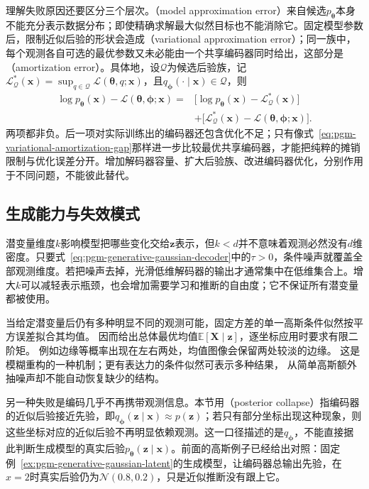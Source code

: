 理解失败原因还要区分三个层次。（model approximation error）来自候选$p_{\bm{\theta}}$本身不能充分表示数据分布；即使精确求解最大似然目标也不能消除它。固定模型参数后，限制近似后验的形状会造成（variational approximation error）；同一族中，每个观测各自可选的最优参数又未必能由一个共享编码器同时给出，这部分是（amortization error）。具体地，设$\mathcal{Q}$为候选后验族，记$\mathcal{L}_{\mathcal{Q}}^*(\bm{x})=\sup_{q\in\mathcal{Q}}\mathcal{L}(\bm{\theta},q;\bm{x})$，且$q_{\bm{\phi}}(\cdot\mid\bm{x})\in\mathcal{Q}$，则
\begin{equation}
  \label{eq:pgm-generative-inference-gaps}
  \begin{aligned}
    \log p_{\bm{\theta}}(\bm{x})
      -\mathcal{L}(\bm{\theta},\bm{\phi};\bm{x})
    ={}&\bigl[\log p_{\bm{\theta}}(\bm{x})
             -\mathcal{L}_{\mathcal{Q}}^*(\bm{x})\bigr]\\
       &+\bigl[\mathcal{L}_{\mathcal{Q}}^*(\bm{x})
             -\mathcal{L}(\bm{\theta},\bm{\phi};\bm{x})\bigr].
  \end{aligned}
\end{equation}
两项都非负。后一项对实际训练出的编码器还包含优化不足；只有像式~\eqref{eq:pgm-variational-amortization-gap}那样进一步比较最优共享编码器，才能把纯粹的摊销限制与优化误差分开。增加解码器容量、扩大后验族、改进编码器优化，分别作用于不同问题，不能彼此替代。

\subsection{生成能力与失效模式}
\label{sec:pgm-generative-vae-failure}

潜变量维度$k$影响模型把哪些变化交给$\bm{z}$表示，但$k<d$并不意味着观测必然没有$d$维密度。只要式~\eqref{eq:pgm-generative-gaussian-decoder}中的$\tau>0$，条件噪声就覆盖全部观测维度。若把噪声去掉，光滑低维解码器的输出才通常集中在低维集合上。增大$k$可以减轻表示瓶颈，也会增加需要学习和推断的自由度；它不保证所有潜变量都被使用。

当给定潜变量后仍有多种明显不同的观测可能，固定方差的单一高斯条件似然按平方误差拟合其均值。
因而给出总体最优均值$\mathbb E[\bm X\mid\bm z]$，逐坐标应用时要求有限二阶矩。
例如边缘等概率出现在左右两处，均值图像会保留两处较淡的边缘。
这是模糊重构的一种机制；更有表达力的条件似然可表示多种结果，
从简单高斯额外抽噪声却不能自动恢复缺少的结构。

另一种失败是编码几乎不再携带观测信息。本节用（posterior collapse）指编码器的近似后验接近先验，即$q_{\bm{\phi}}(\bm{z}\mid\bm{x})\approx p(\bm{z})$；若只有部分坐标出现这种现象，则这些坐标对应的近似后验不再明显依赖观测。这一口径描述的是$q_{\bm{\phi}}$，不能直接据此判断生成模型的真实后验$p_{\bm{\theta}}(\bm{z}\mid\bm{x})$。前面的高斯例子已经给出对照：固定例~\ref{ex:pgm-generative-gaussian-latent}的生成模型，让编码器总输出先验，在$x=2$时真实后验仍为$\mathcal{N}(0.8,0.2)$，只是近似推断没有跟上它。

